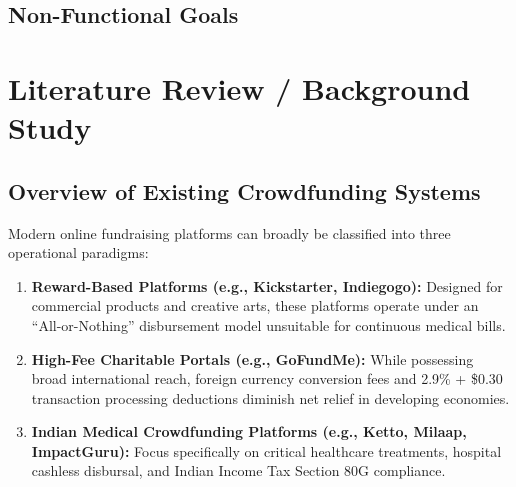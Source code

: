 \documentclass[12pt,a4paper,oneside]{report}
\begin{document}
\section{Non-Functional Goals}

\chapter{Literature Review / Background Study}

\section{Overview of Existing Crowdfunding Systems}
Modern online fundraising platforms can broadly be classified into three operational paradigms:
\begin{enumerate}
    \item \textbf{Reward-Based Platforms (e.g., Kickstarter, Indiegogo):} Designed for commercial products and creative arts, these platforms operate under an ``All-or-Nothing'' disbursement model unsuitable for continuous medical bills.
    \item \textbf{High-Fee Charitable Portals (e.g., GoFundMe):} While possessing broad international reach, foreign currency conversion fees and 2.9\% + \$0.30 transaction processing deductions diminish net relief in developing economies.
    \item \textbf{Indian Medical Crowdfunding Platforms (e.g., Ketto, Milaap, ImpactGuru):} Focus specifically on critical healthcare treatments, hospital cashless disbursal, and Indian Income Tax Section 80G compliance.
\end{enumerate}
\end{document}

